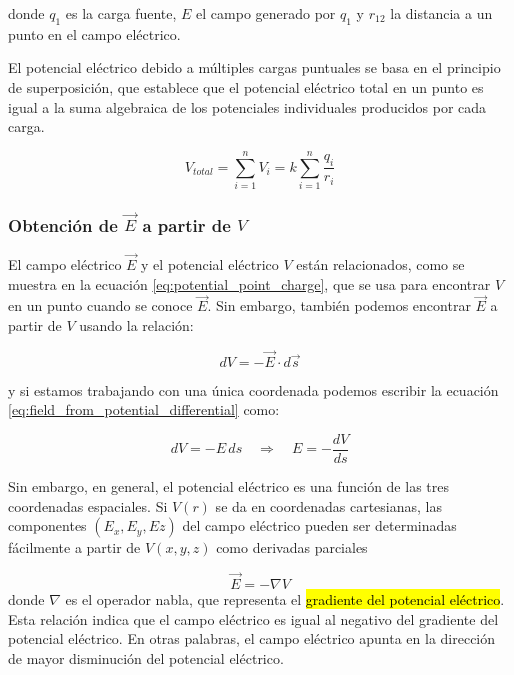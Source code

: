 donde \(q_1\) es la carga fuente, \(E\) el campo generado por \(q_1\) y \(r_{12}\) la distancia a un punto en el campo eléctrico.

El potencial eléctrico debido a múltiples cargas puntuales se basa en el principio de superposición, que establece que el potencial eléctrico total en un punto es igual a la suma algebraica de los potenciales individuales producidos por cada carga.

\begin{equation}
    V_{total} = \sum_{i=1}^{n} V_i = k \sum_{i=1}^{n} \frac{q_i}{r_i}
\end{equation}

\subsubsection{Obtención de \(\vec{E}\) a partir de \(V\)}

El campo eléctrico \(\vec{E}\) y el potencial eléctrico \(V\) están relacionados, como se muestra en la ecuación \eqref{eq:potential_point_charge}, que se usa para encontrar \(V\) en un punto cuando se conoce \(\vec{E}\). Sin embargo, también podemos encontrar \(\vec{E}\) a partir de \(V\) usando la relación:

\begin{equation}
    dV = -\vec{E} \cdot d\vec{s}
    \label{eq:field_from_potential_differential}
\end{equation}

y si estamos trabajando con una única coordenada podemos escribir la ecuación \eqref{eq:field_from_potential_differential} como:

\[
    dV = -E \, ds \quad \Rightarrow \quad E = -\frac{dV}{ds}
\]

Sin embargo, en general, el potencial eléctrico es una función de las tres coordenadas espaciales. Si \(V(r)\) se da en coordenadas cartesianas, las componentes \((E_x, E_y, Ez)\) del campo eléctrico pueden ser determinadas fácilmente a partir de \(V(x, y, z)\) como derivadas parciales

\begin{equation}
    \vec{E} = -\nabla V
    \label{eq:field_from_potential}
\end{equation}
donde \(\nabla\) es el operador nabla, que representa el \hl{gradiente del potencial eléctrico}. Esta relación indica que el campo eléctrico es igual al negativo del gradiente del potencial eléctrico. En otras palabras, el campo eléctrico apunta en la dirección de mayor disminución del potencial eléctrico.

